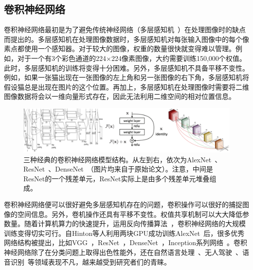\subsection{卷积神经网络}
卷积神经网络最初是为了避免传统神经网络（多层感知机~\cite{gardner1998artificial}）在处理图像时的缺点而提出的。多层感知机在处理图像数据时，多层感知机对每张输入图像中的每个像素点都使用一个感知器。对于较大的图像，权重的数量很快就变得难以管理。例如，对于一个有3个彩色通道的224$\times$224像素图像，大约需要训练150,000个权值。此时，多层感知机的训练将变得十分困难。另外，多层感知机不具备平移不变性。例如，如果一张猫出现在一张图像的左上角和另一张图像的右下角，多层感知机将假设猫总是出现在图片的这个位置。再加上，多层感知机在处理图像时需要将二维图像数据将会以一维向量形式存在，因此无法利用二维空间的相对位置信息。
\begin{figure}[h]
	\centering
	\includegraphics[width=1.0\textwidth]{figure/popular_networks}
	\caption{三种经典的卷积神经网络模型结构。从左到右，依次为AlexNet~\cite{krizhevsky2012imagenet}、ResNet~\cite{he2016deep, he2016identity}、DenseNet~\cite{huang2017densely}（图片均来自于原始论文）。注意，中间是ResNet的一个残差单元，ResNet实际上是由多个残差单元堆叠组成。} 
	\label{fig:popular_networks}
\end{figure}

卷积神经网络便可以很好避免多层感知机存在的问题，卷积操作可以很好的捕捉图像的空间信息。另外，卷机操作还具有平移不变性。权值共享机制可以大大降低参数量。随着计算机算力的快速提升，运用反向传播算法~\cite{hecht1992theory}，卷积神经网络的大规模训练变得切实可行。自Hinton等人利用两块GPU成功训练AlexNet~\cite{krizhevsky2012imagenet}后，很多优秀网络结构被提出，比如VGG~\cite{simonyan2014very}，ResNet~\cite{he2016deep, he2016identity}，DenseNet~\cite{huang2017densely}，Inception系列网络~\cite{szegedy2015going, szegedy2016rethinking, szegedy2017inception}。卷积神经网络除了在分类问题上取得出色性能外，还在自然语言处理~\cite{dos2014deep, mou2016convolutional, li2019knowledge}、无人驾驶~\cite{lee2017deep, csillik2018identification, tang2017vehicle}、语音识别~\cite{abdel2013exploring, swietojanski2014convolutional, robertson2019exploring}等领域表现不凡，越来越受到研究者们的青睐。

